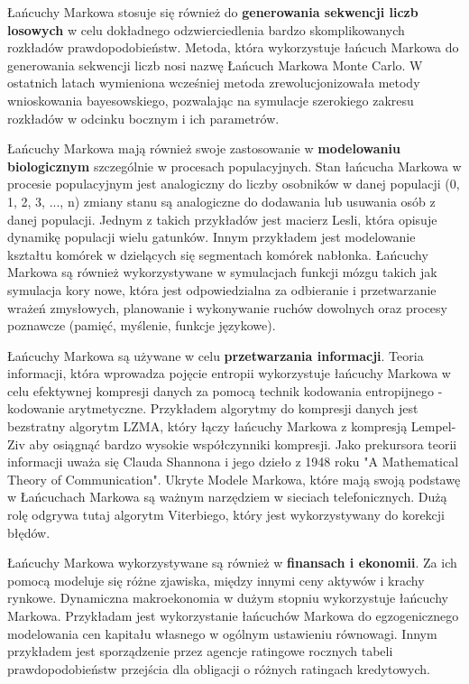 	Łańcuchy Markowa stosuje się również do \textbf{generowania sekwencji liczb losowych} w celu dokładnego odzwierciedlenia bardzo skomplikowanych rozkładów prawdopodobieństw. Metoda, która wykorzystuje łańcuch Markowa do generowania sekwencji liczb nosi nazwę Łańcuch Markowa Monte Carlo. W ostatnich latach wymieniona wcześniej metoda zrewolucjonizowała metody wnioskowania bayesowskiego, pozwalając na symulacje szerokiego zakresu rozkładów w odcinku bocznym i ich parametrów. 

	Łańcuchy Markowa mają również swoje zastosowanie w \textbf{ modelowaniu biologicznym} szczególnie w procesach populacyjnych. Stan łańcucha Markowa w procesie populacyjnym jest analogiczny do liczby osobników w danej populacji (0, 1, 2, 3, ..., n) zmiany stanu są analogiczne do dodawania lub usuwania osób z danej populacji. Jednym z takich przykładów jest macierz Lesli, która opisuje dynamikę populacji wielu gatunków. Innym przykładem jest modelowanie kształtu komórek w dzielących się segmentach komórek nabłonka. Łańcuchy Markowa są również wykorzystywane w symulacjach funkcji mózgu takich jak symulacja kory nowe, która jest odpowiedzialna za odbieranie i przetwarzanie wrażeń zmysłowych, planowanie i wykonywanie ruchów dowolnych oraz procesy poznawcze (pamięć, myślenie, funkcje językowe). 

	Łańcuchy Markowa są używane w celu \textbf{przetwarzania informacji}. Teoria informacji, która wprowadza pojęcie entropii wykorzystuje łańcuchy Markowa w celu efektywnej kompresji danych za pomocą technik kodowania entropijnego - kodowanie arytmetyczne. Przykładem algorytmy do kompresji danych jest bezstratny algorytm LZMA, który łączy łańcuchy Markowa z kompresją Lempel-Ziv aby osiągnąć bardzo wysokie współczynniki kompresji. Jako prekursora teorii informacji uważa się Clauda Shannona i jego dzieło z 1948 roku "A Mathematical Theory of Communication". Ukryte Modele Markowa, które mają swoją podstawę w Łańcuchach Markowa są ważnym narzędziem w sieciach telefonicznych. Dużą rolę odgrywa tutaj algorytm Viterbiego, który jest wykorzystywany do korekcji błędów.

	Łańcuchy Markowa wykorzystywane są również w \textbf{finansach i ekonomii}. Za ich pomocą modeluje się różne zjawiska, między innymi ceny aktywów i krachy rynkowe. Dynamiczna makroekonomia w dużym stopniu wykorzystuje łańcuchy Markowa. Przykładam jest wykorzystanie łańcuchów Markowa do egzogenicznego modelowania cen kapitału własnego w ogólnym ustawieniu równowagi. Innym przykładem jest sporządzenie przez agencje ratingowe rocznych tabeli prawdopodobieństw przejścia dla obligacji o różnych ratingach kredytowych. 
	
